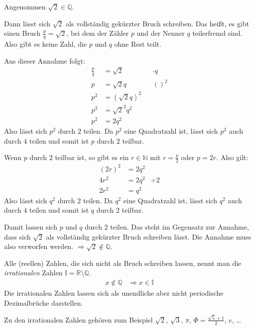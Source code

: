 \begin{bew}
 Angenommen \(\sqrt{2}\in\mathbb{Q}\).
 
 Dann lässt sich \(\sqrt{2}\) als vollständig gekürzter Bruch schreiben. Das heißt, es gibt einen Bruch \(\frac{p}{q}=\sqrt{2}\), bei dem der Zähler \(p\) und der Nenner \(q\) teilerfremd sind. Also gibt es keine Zahl, die \(p\) und \(q\) ohne Rest teilt.
 
 Aus dieser Annahme folgt: 
 \begin{align*}
  \frac{p}{q}&=\sqrt{2}&& \cdot q\\
  p&= \sqrt{2}q &&()^2\\
  p^2 &= \left(\sqrt{2}q\right)^2 \\
  p^2 &= \sqrt{2}^2q^2 \\
  p^2 &= 2q^2
 \end{align*}
 Also lässt sich \(p^2\) durch \(2\) teilen. Da \(p^2\) eine Quadratzahl ist, lässt sich \(p^2\) auch durch \(4\) teilen und somit ist \(p\) durch \(2\) teilbar.
 
 Wenn \(p\) durch \(2\) teilbar ist, so gibt es ein \(r\in\mathbb{N}\) mit \(r=\frac{p}{2}\) oder \(p=2r\). Also gilt: \begin{align*}
 (2r)^2 &= 2q^2 \\
 4r^2 &= 2q^2 & \div 2\\
 2r^2 &= q^2
 \end{align*}
 Also lässt sich \(q^2\) durch \(2\) teilen. Da \(q^2\) eine Quadratzahl ist, lässt sich \(q^2\) auch durch \(4\) teilen und somit ist \(q\) durch \(2\) teilbar.
 
 Damit lassen sich \(p\) und \(q\) durch \(2\) teilen. Das steht im Gegensatz zur Annahme, dass sich \(\sqrt{2}\) als vollständig gekürzter Bruch schreiben lässt. Die Annahme muss also verworfen werden. \(\Rightarrow \sqrt{2} \not\in\mathbb{Q}\).
\end{bew}


\begin{defi}
Alle (reellen) Zahlen, die sich nicht als Bruch schreiben lassen, nennt man die \emph{irrationalen} Zahlen \(\mathbb{I}=\mathbb{R}\setminus\mathbb{Q}\).
\begin{align*}
 x\not\in \mathbb{Q} &\Rightarrow x\in\mathbb{I}
\end{align*}
Die irrationalen Zahlen lassen sich als unendliche aber nicht periodische Dezimalbrüche darstellen.

Zu den irrationalen Zahlen gehören zum Beispiel \(\sqrt{2}\), \(\sqrt{3}\), \(\pi\), \(\Phi = \frac{\sqrt{5}+1}{2}\), \(e\), \ldots
\end{defi}

